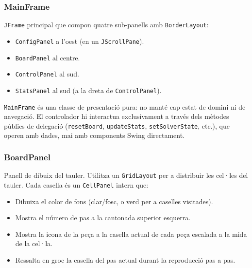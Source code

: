 \documentclass[conference,compsoc]{IEEEtran}
\begin{document}
\subsubsection{MainFrame}

\texttt{JFrame} principal que compon quatre sub-panells amb
\texttt{BorderLayout}:

\begin{itemize}
    \item \texttt{ConfigPanel} a l'oest (en un \texttt{JScrollPane}).
    \item \texttt{BoardPanel} al centre.
    \item \texttt{ControlPanel} al sud.
    \item \texttt{StatsPanel} al sud (a la dreta de \texttt{ControlPanel}).
\end{itemize}

\texttt{MainFrame} és una classe de presentació pura: no manté cap
estat de domini ni de navegació. El controlador hi interactua
exclusivament a través dels mètodes públics de delegació
(\texttt{resetBoard}, \texttt{updateStats}, \texttt{setSolverState},
etc.), que operen amb dades, mai amb components Swing directament.

\subsubsection{BoardPanel}

Panell de dibuix del tauler. Utilitza un \texttt{GridLayout} per a
distribuir les cel·les del tauler. Cada casella és un
\texttt{CellPanel} intern que:

\begin{itemize}
    \item Dibuixa el color de fons (clar/fosc, o verd per a
          caselles visitades).
    \item Mostra el número de pas a la cantonada
          superior esquerra.
    \item Mostra la icona de la peça a la casella actual de cada
          peça escalada a la mida de la cel·la.
    \item Ressalta en groc la casella del pas actual durant la
          reproducció pas a pas.
\end{itemize}
\end{document}
